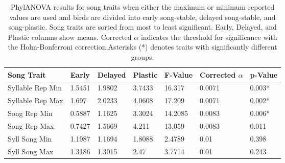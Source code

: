 \documentclass[a4paper,12pt]{article}
\begin{document}
\begin{table}[ht]
\caption{PhylANOVA results for song traits when either the maximum or minimum reported values are used and birds are divided into early song-stable, delayed song-stable, and song-plastic. Song traits are sorted from most to least significant. Early, Delayed, and Plastic columns show means. Corrected $\alpha$ indicates the threshold for significance with the Holm-Bonferroni correction.Asterisks (*) denotes traits with significantly different groups.}
\centering
\begin{tabular}{lllllll}
  \hline
Song Trait & Early & Delayed & Plastic & F-Value & Corrected $\alpha$ & p-Value \\ 
  \hline
Syllable Rep Min & 1.5451 & 1.9802 & 3.7433 & 16.317 & 0.0071 & 0.003* \\ 
  Syllable Rep Max & 1.697 & 2.0233 & 4.0608 & 17.209 & 0.0071 & 0.002* \\ 
  Song Rep Min & 0.5887 & 1.1625 & 3.3024 & 14.2085 & 0.0083 & 0.006* \\ 
  Song Rep Max & 0.7427 & 1.5669 & 4.211 & 13.059 & 0.0083 & 0.011 \\ 
  Syll Song Min & 1.1987 & 1.1694 & 1.8088 & 2.4789 & 0.01 & 0.398 \\ 
  Syll Song Max & 1.3186 & 1.3015 & 2.47 & 3.7714 & 0.01 & 0.243 \\ 
   \hline
\end{tabular}
\end{table}
\end{document}
